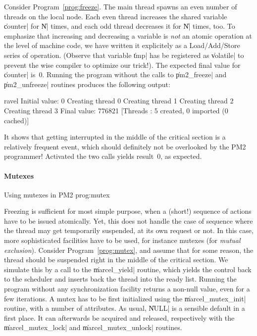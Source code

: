 Consider Program~\ref{prog:freeze}. The main thread spawns an even
number of threads on the local node. Each even thread increases the
shared variable \|counter| for \|N| times, and each odd thread decreases
it for \|N| times, too. To emphasize that increasing and decreasing a
variable is \emph{not} an atomic operation at the level of machine
code, we have written it explicitely as a Load/Add/Store series of
operation. (Observe that variable \|tmp| has be registered as
\|volatile| to prevent the wise compiler to optimize our
trick!). The expected final value for \|counter| is~0.  Running the
program without the calls to \|pm2_freeze| and \|pm2_unfreeze|
routines produces the following output:
\begin{shell}
ravel%
Initial value: 0
Creating thread 0
Creating thread 1
Creating thread 2
Creating thread 3
Final value: 776821
[Threads : 5 created, 0 imported (0 cached)]
\end{shell}
It shows that getting interrupted in the middle of the critical section
is a relatively frequent event, which should definitely not be
overlooked by the PM2 programmer! Activated the two calls yields
result~0, as expected.

\paragraph{Mutexes}

 {Using mutexes in PM2}
{prog:mutex}

Freezing is sufficient for most simple purpose, when a (short!)
sequence of actions have to be issued atomically. Yet, this does not
handle the case of sequence where the thread may get temporarily
suspended, at its own request or not. In this case, more sophisticated
facilities have to be used, for instance mutexes (for \emph{mutual
  exclusion}). Consider Program~\ref{prog:mutex}, and assume that for
some reason, the thread should be suspended right in the middle of the
critical section. We simulate this by a call to the \|marcel_yield|
routine, which yields the control back to the scheduler and inserts
back the thread into the ready list. Running the program without any
synchronization facility returns a non-null value, even for a few
iterations. A mutex has to be first initialized using the
\|marcel_mutex_init| routine, with a number of attributes. As usual,
\|NULL| is a sensible default in a first place.  It can afterwards be
acquired and released, respectively with the \|marcel_mutex_lock| and
\|marcel_mutex_unlock| routines.

